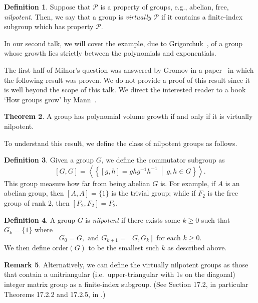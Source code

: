 \documentclass[11pt,a4paper,reqno]{amsart}
\theoremstyle{plain}
\theoremstyle{definition}
\newtheorem{theorem}{Theorem}[section]
\newtheorem{definition}[theorem]{Definition}
\theoremstyle{definition}
\newtheorem{remark}[theorem]{Remark}
\renewcommand\geq\geqslant
\begin{document}
\begin{definition}
	Suppose that $\mathcal{P}$ is a property of groups, e.g., abelian, free, \emph{nilpotent}.
	Then, we say that a group is \emph{virtually $\mathcal{P}$} if it contains a finite-index subgroup which has property $\mathcal{P}$.
\end{definition}

In our second talk, we will cover the example, due to Grigorchuk~\cite{GrigrochukInter,GrigorchukBurnside}, of a group whose growth lies strictly between the polynomials and exponentials.

The first half of Milnor's question was answered by Gromov in a paper~\cite{Gromov1981} in which the following result was proven.
We do not provide a proof of this result since it is well beyond the scope of this talk.
We direct the interested reader to a book `How groups grow' by Mann~\cite{Mann}.

\begin{theorem}
	A group has polynomial volume growth if and only if it is virtually nilpotent.
\end{theorem}

To understand this result, we define the class of nilpotent groups as follows.


\begin{definition}
	Given a group $G$, we define the commutator subgroup as
	\[
	[G,G] = \left\langle\left\{ [g,h] = ghg^{-1}h^{-1}
	\ \middle|\ 
	g,h\in G \right\}\right\rangle.
	\]
	This group measure how far from being abelian $G$ is.
	For example, if $A$ is an abelian group, then $[A,A] = \{1\}$ is the trivial group;
	while if $F_2$ is the free group of rank 2, then $[F_2,F_2] = F_2$.
\end{definition}

\begin{definition}
	A group $G$ is \emph{nilpotent} if there exists some $k\geq 0$ such that $G_k=\{1\}$ where
	\[
	G_0 = G,
	\text{ and }
	G_{k+1} = [G,G_k]\text{ for each }k \geq 0.
	\]
	We then define $\mathrm{order}(G)$ to be the smallest such $k$ as described above.
\end{definition}

\begin{remark}
	Alternatively, we can define the virtually nilpotent groups as those that contain a unitriangular (i.e.~upper-triangular with $1$s on the diagonal) integer matrix group as a finite-index subgroup. (See Section 17.2, in particular Theorems 17.2.2 and 17.2.5, in \cite{Kargapolov1979}.)
\end{remark}
\end{document}
